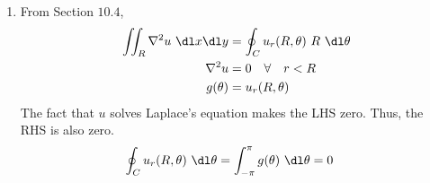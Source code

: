 \begin{enumerate}
\begin{enumerate}
              \item From Section $ 10.4 $,
                    \begin{align}
                        \iint_R \nabla^2 u\ \dl x \dl y &
                        = \oint_C u_r(R, \theta)\ R\ \dl \theta            \\
                        \nabla^2 u                      &
                        = 0 \quad \forall \quad  r < R                     \\
                        g(\theta)                       & = u_r(R, \theta)
                    \end{align}
                    The fact that $ u $ solves Laplace's equation makes the LHS zero.
                    Thus, the RHS is also zero.
                    \begin{align}
                        \oint_C u_r(R, \theta)\ \dl \theta & = \int_{-\pi}^{\pi}
                        g(\theta)\ \dl \theta = 0
                    \end{align}


\end{enumerate}
\end{enumerate}

